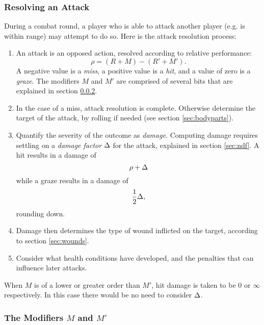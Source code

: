 \documentclass[12pt]{article}
\newcommand{\emdex}[1]{\emph{#1}\index{#1}}
\begin{document}
\subsubsection{Resolving an Attack}
During a combat round, a player who is able to attack another player (e.g. is within range) may attempt to do so.
Here is the attack resolution process:
\vspace{-1em}\begin{enumerate}
\item
An attack is an opposed action, resolved according to relative performance:
$$ \rho = (R + M) - (R' + M'). $$
A negative value is a \emdex{miss}, a positive value is a \emdex{hit}, and a value of zero is a \emdex{graze}.
The modifiers $M$ and $M'$ are comprised of several bits that are explained in section \ref{sec:sitmod}.
\item
In the case of a miss, attack resolution is complete.
Otherwise determine the target of the attack, by rolling if needed (see section \ref{sec:bodyparts}).
\item
Quantify the severity of the outcome as \emdex{damage}.
Computing damage requires settling on a \emph{damage factor} $\Delta$ for the attack, explained in section \ref{sec:ndf}.
A hit results in a damage of
$$ \rho + \Delta $$
while a graze results in a damage of
$$ \frac{1}{2} \Delta, $$
rounding down.
\item
Damage then determines the type of wound inflicted on the target, according to section \ref{sec:wounds}.
\item
Consider what health conditions have developed, and the penalties that can influence later attacks.
\end{enumerate}

When $M$ is of a lower or greater order than $M'$, hit damage is taken to be $0$ or $\infty$ respectively.
In this case there would be no need to consider $\Delta$.


\subsubsection{The Modifiers $M$ and $M'$}\label{sec:sitmod}
\end{document}
